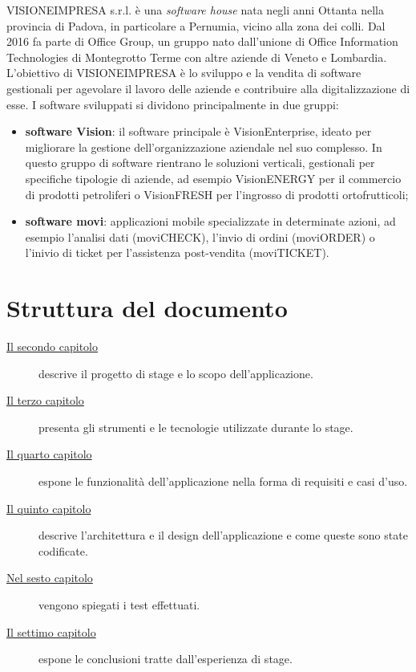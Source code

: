 VISIONEIMPRESA s.r.l. è una \textit{software house} nata negli anni Ottanta nella provincia di Padova, in particolare a Pernumia, vicino alla zona dei colli. Dal 2016 fa parte di Office Group, un gruppo nato dall'unione di Office Information Technologies di Montegrotto Terme con altre aziende di Veneto e Lombardia.\\
L'obiettivo di VISIONEIMPRESA è lo sviluppo e la vendita di software gestionali per agevolare il lavoro delle aziende e contribuire alla digitalizzazione di esse. I software sviluppati si dividono principalmente in due gruppi:
\begin{itemize}
    \item \textbf{software Vision}: il software principale è VisionEnterprise, ideato per migliorare la gestione dell'organizzazione aziendale nel suo complesso. In questo gruppo di software rientrano le soluzioni verticali, gestionali per specifiche tipologie di aziende, ad esempio VisionENERGY per il commercio di prodotti petroliferi o VisionFRESH per l'ingrosso di prodotti ortofrutticoli;
    \item \textbf{software movi}: applicazioni mobile specializzate in determinate azioni, ad esempio l'analisi dati (moviCHECK), l'invio di ordini (moviORDER) o l'inivio di ticket per l'assistenza post-vendita (moviTICKET).
\end{itemize}


\section{Struttura del documento}

\begin{description} 
    \item[{\hyperref[cap:descrizione-stage]{Il secondo capitolo}}] descrive il progetto di stage e lo scopo dell'applicazione.
    
    \item[{\hyperref[cap:strumenti-tecnologie]{Il terzo capitolo}}] presenta gli strumenti e le tecnologie utilizzate durante lo stage.
    
    \item[{\hyperref[cap:analisi-requisiti]{Il quarto capitolo}}] espone le funzionalità dell'applicazione nella forma di requisiti e casi d'uso.
    
    \item[{\hyperref[cap:progettazione-codifica]{Il quinto capitolo}}] descrive l'architettura e il design dell'applicazione e come queste sono state codificate.
    
    \item[{\hyperref[cap:verifica-validazione]{Nel sesto capitolo}}] vengono spiegati i test effettuati.
    
    \item[{\hyperref[cap:conclusioni]{Il settimo capitolo}}] espone le conclusioni tratte dall'esperienza di stage.
\end{description}
